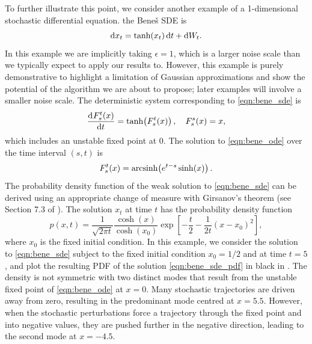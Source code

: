 To further illustrate this point, we consider another example of a 1-dimensional stochastic differential equation.
the Bene\v{s} SDE \citep{SarkkaSolin_2019_AppliedStochasticDifferential} is
\begin{equation}
	\dif x_t = \tanh\!\left(x_t\right)\dif t + \dif W_t.
	\label{eqn:bene_sde}
\end{equation}
In this example we are implicitly taking \(\epsilon = 1\), which is a larger noise scale than we typically expect to apply our results to.
However, this example is purely demonstrative to highlight a limitation of Gaussian approximations and show the potential of the algorithm we are about to propose; later examples will involve a smaller noise scale.
The deterministic system corresponding to \cref{eqn:bene_sde} is
\begin{equation}
	\dod{F_s^t\!\left(x\right)}{t} = \tanh\!\left(F_s^t\!\left(x\right)\right), \quad F_s^s\!\left(x\right) = x,
	\label{eqn:bene_ode}
\end{equation}
which includes an unstable fixed point at \(0\).
The solution to \cref{eqn:bene_ode} over the time interval \((s,t)\) is
\begin{equation}
	F_s^t\!\left(x\right) = \operatorname{arcsinh}\!\left(e^{t-s}\sinh\!\left(x\right)\right).
	\label{eqn:bene_ode_sol}
\end{equation}
The probability density function of the weak solution to \cref{eqn:bene_sde} can be derived using an appropriate change of measure with Girsanov's theorem (see Section 7.3 of \citet{SarkkaSolin_2019_AppliedStochasticDifferential}).
The solution \(x_t\) at time \(t\) has the probability density function
\begin{equation}\label{eqn:bene_sde_pdf}
	p(x,t) = \frac{1}{\sqrt{2\pi t}}\frac{\cosh\!\left(x\right)}{\cosh\!\left(x_0\right)}\exp\left[-\frac{t}{2} - \frac{1}{2t}\left(x - x_0\right)^2\right],
\end{equation}
where \(x_0\) is the fixed initial condition.
In this example, we consider the solution to \cref{eqn:bene_sde} subject to the fixed initial condition \(x_0 = 1/2\) and at time \(t = 5\), and plot the resulting PDF of the solution \cref{eqn:bene_sde_pdf} in black in .
The density is not symmetric with two distinct modes that result from the unstable fixed point of \cref{eqn:bene_ode} at \(x = 0\).
Many stochastic trajectories are driven away from zero, resulting in the predominant mode centred at \(x = 5.5\).
However, when the stochastic perturbations force a trajectory through the fixed point and into negative values, they are pushed further in the negative direction, leading to the second mode at \(x = -4.5\).
